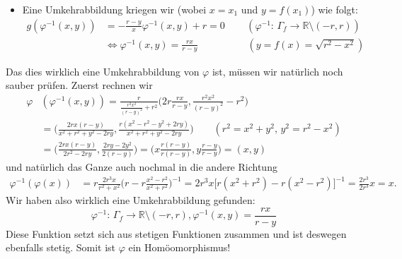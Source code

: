 \begin{Beispiel}
\begin{itemize}
        \item Eine Umkehrabbildung kriegen wir (wobei $x=x_1$ und $y=f(x_1)$) wie folgt:
        \begin{align*}
            g(\varphi^{-1}(x,y))&=-\frac{r-y}{x}\varphi^{-1}(x,y)+r = 0 \qquad\, (\varphi^{-1}:\,\Gamma_f\longrightarrow \mathbb{R}\setminus(-r,r)) \\
            &\Leftrightarrow \varphi^{-1}(x,y)=\frac{rx}{r-y} \qquad \qquad \quad (y=f(x)=\sqrt{r^2-x^2})
        \end{align*}
    \end{itemize}
    Das dies wirklich eine Umkehrabbildung von $\varphi$ ist, müssen wir natürlich noch sauber prüfen. Zuerst rechnen wir
    \begin{align*}
        \varphi&(\varphi^{-1}(x,y))=\frac{r}{\frac{r^2x^2}{(r-y)^2}+r^2}\Big( 2r\frac{rx}{r-y}, \frac{r^2x^2}{(r-y)^2}-r^2 \Big) \\
        &= \Big( \frac{2rx(r-y)}{x^2+r^2+y^2-2ry}, \frac{r(x^2-r^2-y^2+2ry)}{x^2+r^2+y^2-2ry} \Big) \qquad (r^2=x^2+y^2,\, y^2=r^2-x^2) \\
        &= \Big( \frac{2rx(r-y)}{2r^2-2ry}, \frac{2ry-2y^2}{2(r-y)} \Big) = \Big( x\frac{r(r-y)}{r(r-y)}, y\frac{r-y}{r-y} \Big) = (x,y)
    \end{align*}
    und natürlich das Ganze auch nochmal in die andere Richtung
    \begin{align*}
        \varphi^{-1}(\varphi(x)) &= r\frac{2r^3x}{r^2+x^2}\Big( r-r\frac{x^2-r^2}{x^2+r^2} \Big)^{-1} = 2r^3x\big[ r(x^2+r^2)-r(x^2-r^2) \big]^{-1} = \frac{2r^3}{2r^3}x=x.
    \end{align*}
    Wir haben also wirklich eine Umkehrabbildung gefunden:
    \begin{equation*}
        \varphi^{-1}:\, \Gamma_f\rightarrow\mathbb{R}\setminus(-r,r), \varphi^{-1}(x,y)=\frac{rx}{r-y}
    \end{equation*}
    Diese Funktion setzt sich aus stetigen Funktionen zusammen und ist deswegen ebenfalls stetig. Somit ist $\varphi$ ein Homöomorphismus! \\
    

\end{Beispiel}
